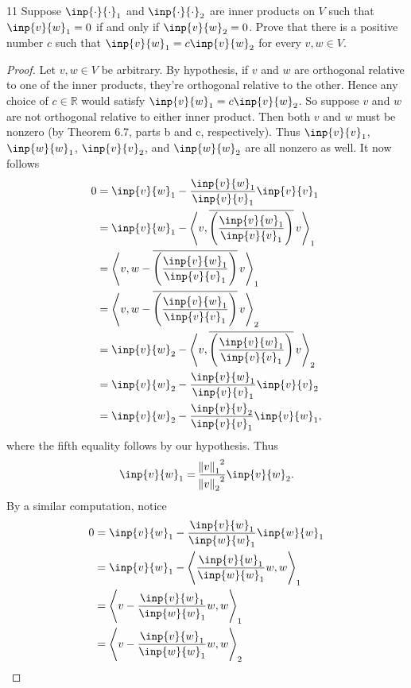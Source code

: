 \documentclass{extarticle}
\newenvironment{problem}[1]{\begin{prob*}{#1}{}}{\end{prob*}}
\newcommand{\R}{\mathbb{R}}
\newcommand\widebar[1]{\mathop{\overline{#1}}}
\begin{document}
\begin{problem}{11}
Suppose $\inp{\cdot}{\cdot}_1$ and $\inp{\cdot}{\cdot}_2$ are inner products on $V$ such that $\inp{v}{w}_1 = 0$ if and only if $\inp{v}{w}_2 = 0$.  Prove that there is a positive number $c$ such that $\inp{v}{w}_1 = c\inp{v}{w}_2$ for every $v,w\in V$.
\end{problem}
\begin{proof}
Let $v, w\in V$ be arbitrary.  By hypothesis, if $v$ and $w$ are orthogonal relative to one of the inner products, they're orthogonal relative to the other.  Hence any choice of $c\in \R$ would satisfy $\inp{v}{w}_1 = c\inp{v}{w}_2$.  So suppose $v$ and $w$ are not orthogonal relative to either inner product.  Then both $v$ and $w$ must be nonzero (by Theorem 6.7, parts b and c, respectively).  Thus $\inp{v}{v}_1$, $\inp{w}{w}_1$, $\inp{v}{v}_2$, and $\inp{w}{w}_2$ are all nonzero as well.  It now follows
\begin{align*}
0 &= \inp{v}{w}_1 - \frac{\inp{v}{w}_1}{\inp{v}{v}_1}\inp{v}{v}_1\\
&= \inp{v}{w}_1 - \left\langle v, \widebar{\left(\frac{\inp{v}{w}_1}{\inp{v}{v}_1}\right)}v \right\rangle_1\\
&= \left\langle v, w - \widebar{\left(\frac{\inp{v}{w}_1}{\inp{v}{v}_1}\right)}v \right\rangle_1\\
&= \left\langle v, w - \widebar{\left(\frac{\inp{v}{w}_1}{\inp{v}{v}_1}\right)}v \right\rangle_2\\
&= \inp{v}{w}_2 - \left\langle v, \widebar{\left(\frac{\inp{v}{w}_1}{\inp{v}{v}_1}\right)}v \right\rangle_2\\
&= \inp{v}{w}_2 - \frac{\inp{v}{w}_1}{\inp{v}{v}_1}\inp{v}{v}_2\\
&= \inp{v}{w}_2 - \frac{\inp{v}{v}_2}{\inp{v}{v}_1}\inp{v}{w}_1,
\end{align*}
where the fifth equality follows by our hypothesis.  Thus 
\begin{equation}
\inp{v}{w}_1 = \frac{{\norm{v}_1}^2}{{\norm{v}_2}^2}\inp{v}{w}_2. \label{eq4}
\end{equation}
By a similar computation, notice
\begin{align*}
0 &= \inp{v}{w}_1 - \frac{\inp{v}{w}_1}{\inp{w}{w}_1}\inp{w}{w}_1\\
&= \inp{v}{w}_1 - \left\langle \frac{\inp{v}{w}_1}{\inp{w}{w}_1}w, w \right\rangle_1\\
&= \left\langle v - \frac{\inp{v}{w}_1}{\inp{w}{w}_1}w, w \right\rangle_1\\
&= \left\langle v - \frac{\inp{v}{w}_1}{\inp{w}{w}_1}w, w \right\rangle_2\\

\end{align*}
\end{proof}
\end{document}
